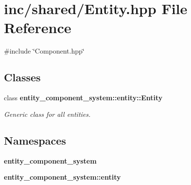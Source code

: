 \section{inc/shared/\+Entity.hpp File Reference}
\label{_entity_8hpp}
{\ttfamily \#include \char`\"{}Component.\+hpp\char`\"{}}\newline
\subsection*{Classes}
\begin{DoxyCompactItemize}
\item 
class {\bf entity\+\_\+component\+\_\+system\+::entity\+::\+Entity}
\begin{DoxyCompactList}\small\item\em Generic class for all entities. \end{DoxyCompactList}\end{DoxyCompactItemize}
\subsection*{Namespaces}
\begin{DoxyCompactItemize}
\item 
 {\bf entity\+\_\+component\+\_\+system}
\item 
 {\bf entity\+\_\+component\+\_\+system\+::entity}
\end{DoxyCompactItemize}
